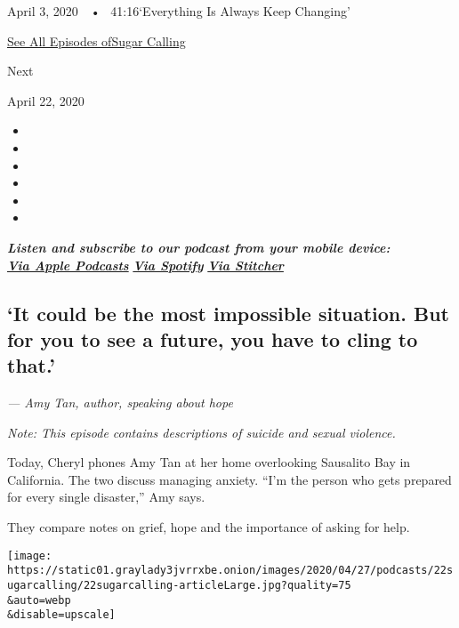 April 3, 2020~~•~ 41:16`Everything Is Always Keep Changing'

\href{https://www.nytimes3xbfgragh.onion/column/sugar-calling}{See All
Episodes ofSugar Calling}

Next

April 22, 2020

\begin{itemize}
\item
\item
\item
\item
\item
\item
\end{itemize}

\emph{\textbf{Listen and subscribe to our podcast from your mobile
device:}}\\
\textbf{\href{https://podcasts.apple.com/us/podcast/sugar-calling/id1505881384}{\emph{Via
Apple Podcasts}}} \emph{\textbf{\textbar{}}}
\textbf{\href{https://open.spotify.com/show/4U8hPiNGIBvTS9zLeiDCN7?si=gRyigD47SPWl-QWgNjgt2w}{\emph{Via
Spotify}}} \emph{\textbf{\textbar{}}}
\textbf{\href{https://www.stitcher.com/podcast/the-new-york-times/sugar-calling}{\emph{Via
Stitcher}}}

\hypertarget{it-could-be-the-most-impossible-situation-but-for-you-to-see-a-future-you-have-to-cling-to-that}{%
\subsection{`It could be the most impossible situation. But for you to
see a future, you have to cling to
that.'}\label{it-could-be-the-most-impossible-situation-but-for-you-to-see-a-future-you-have-to-cling-to-that}}

\emph{--- Amy Tan, author, speaking about hope}

\emph{Note: This episode contains descriptions of suicide and sexual
violence.}

Today, Cheryl phones Amy Tan at her home overlooking Sausalito Bay in
California. The two discuss managing anxiety. ``I'm the person who gets
prepared for every single disaster,'' Amy says.

They compare notes on grief, hope and the importance of asking for help.

\texttt{[image: https://static01.graylady3jvrrxbe.onion/images/2020/04/27/podcasts/22sugarcalling/22sugarcalling-articleLarge.jpg?quality=75\\\&auto=webp\\\&disable=upscale]}

